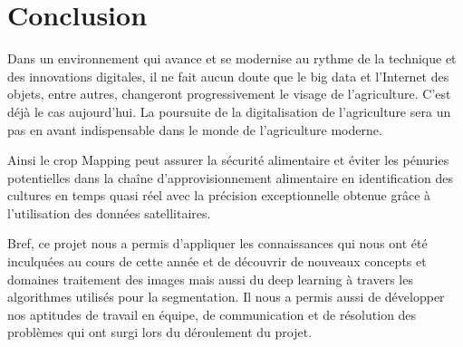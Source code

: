\documentclass[12pt, openany]{report}
\begin{document}
\chapter*{Conclusion}
Dans un environnement qui avance et se modernise au rythme de la technique et des innovations digitales, il ne fait aucun doute que le big data et l'Internet des objets, entre autres, changeront progressivement le visage de l'agriculture. C’est déjà le cas aujourd’hui. La poursuite de la digitalisation de l'agriculture sera un pas en avant indispensable dans le monde de l'agriculture moderne.
\par
Ainsi le crop Mapping peut assurer la sécurité alimentaire et éviter les pénuries potentielles dans la chaîne d'approvisionnement alimentaire en identification des cultures en temps quasi réel avec la précision exceptionnelle obtenue grâce à l'utilisation des données satellitaires.
\par
Bref, ce projet nous a permis d’appliquer les connaissances qui nous ont été inculquées au cours de cette année et de découvrir de nouveaux concepts et domaines traitement des images mais aussi du deep learning à travers les algorithmes utilisés pour la segmentation.
Il nous a permis aussi de développer nos aptitudes de travail en équipe, de communication et de résolution des problèmes qui ont surgi lors du déroulement du projet.



\end{document}
